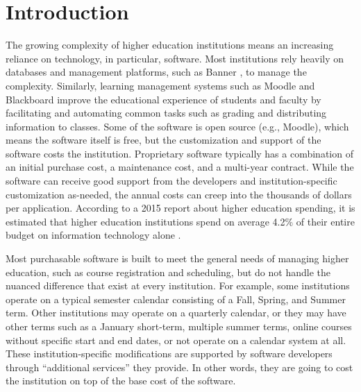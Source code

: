 \section{Introduction}

The growing complexity of higher education institutions means an increasing reliance on technology, in particular, software. Most institutions rely heavily on databases and management platforms, such as Banner \cite{BannerWebsite}, to manage the complexity. Similarly, learning management systems such as Moodle \cite{MoodleWebsite} and Blackboard \cite{BlackboardWebsite} improve the educational experience of students and faculty by facilitating and automating common tasks such as grading and distributing information to classes. Some of the software is open source (e.g., Moodle), which means the software itself is free, but the customization and support of the software costs the institution. Proprietary software typically has a combination of an initial purchase cost, a maintenance cost, and a multi-year contract. While the software can receive good support from the developers and institution-specific customization as-needed, the annual costs can creep into the thousands of dollars per application. According to a 2015 report about higher education spending, it is estimated that higher education institutions spend on average 4.2\% of their entire budget on information technology alone \cite{CDSBenchmarkReport}. 

Most purchasable software is built to meet the general needs of managing higher education, such as course registration and scheduling, but do not handle the nuanced difference that exist at every institution. For example, some institutions operate on a typical semester calendar consisting of a Fall, Spring, and Summer term. Other institutions may operate on a quarterly calendar, or they may have other terms such as a January short-term, multiple summer terms, online courses without specific start and end dates, or not operate on a calendar system at all. These institution-specific modifications are supported by software developers through ``additional services'' they provide. In other words, they are going to cost the institution on top of the base cost of the software.

